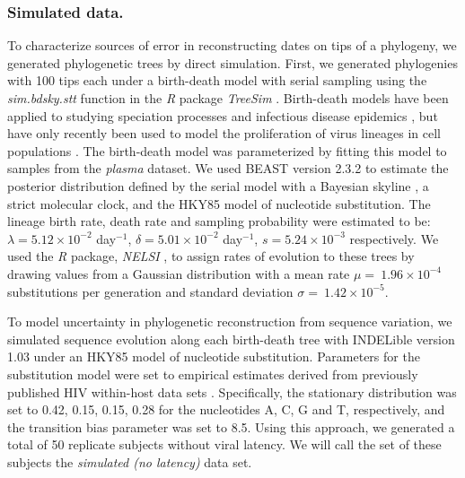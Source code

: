 \documentclass[12pt]{article}
\begin{document}
\subsubsection * {Simulated data.} \label{subsec:simdata}


To characterize sources of error in reconstructing dates on tips of a phylogeny, we generated phylogenetic trees by direct simulation. %
First, we generated phylogenies with 100 tips each under a birth-death model with serial sampling using the \emph{sim.bdsky.stt} function in the \textit{R} package \textit{TreeSim} \cite{Boskova14}.
Birth-death models have been applied to studying speciation processes \cite{Nee:2006} and infectious disease epidemics \cite{Stradler13}, but have only recently been used to model the proliferation of virus lineages in cell populations \cite{Hartfield:2015}.
The birth-death model was parameterized by fitting this model to samples from the {\em plasma} dataset.
We used BEAST version 2.3.2 \cite{BEAST2} to estimate the posterior distribution defined by the serial model with a Bayesian skyline \cite{Stadler13}, a strict molecular clock, and the HKY85 \cite{HKY85} model of nucleotide substitution.
The lineage birth rate, death rate and sampling probability were estimated to be: $\lambda = 5.12 \times 10^{-2}$ day$^{-1}$, $\delta = 5.01 \times 10^{-2}$ day$^{-1}$, $s = 5.24 \times 10^{-3}$ respectively.
We used the \textit{R} package, \emph{NELSI} \cite{NELSI}, to assign rates of evolution to these trees by drawing values from a Gaussian distribution with a mean rate $\mu = \ 1.96\times 10^{-4}$ substitutions per generation and standard deviation $\sigma = \ 1.42\times 10^{-5}$. %

To model uncertainty in phylogenetic reconstruction from sequence variation, we simulated sequence evolution along each birth-death tree with INDELible version 1.03 \cite{Indelible09} under an HKY85 \cite{HKY85} model of nucleotide substitution.
Parameters for the substitution model were set to empirical estimates derived from previously published HIV within-host data sets \cite{McCloskey14}. 
Specifically, the stationary distribution was set to 0.42, 0.15, 0.15, 0.28 for the nucleotides A, C, G and T, respectively, and the transition bias parameter was set to 8.5.
Using this approach, we generated a total of 50 replicate subjects without viral latency.
We will call the set of these subjects the \emph{simulated (no latency)} data set.
\end{document}
